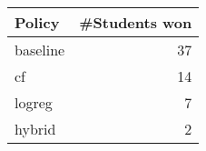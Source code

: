 \begin{tabular}{lr}
\toprule
Policy & #Students won \\
\midrule
baseline & 37 \\
cf & 14 \\
logreg & 7 \\
hybrid & 2 \\
\bottomrule
\end{tabular}
